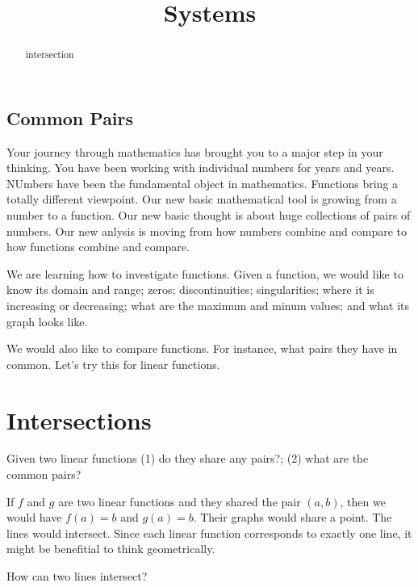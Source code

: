 \documentclass{ximera}
\title{Systems}
\begin{document}
\begin{abstract}
intersection
\end{abstract}
\maketitle



\subsection{Common Pairs}

Your journey through mathematics has brought you to a major step in your thinking. You have been working with individual numbers for years and years. NUmbers have been the fundamental object in mathematics. Functions bring a totally different viewpoint. Our new basic mathematical tool is growing from a number to a function.  Our new basic thought is about huge collections of pairs of numbers.  Our new anlysis is moving from how numbers combine and compare to how functions combine and compare.

We are learning how to investigate functions.  Given a function, we would like to know its domain and range; zeros; discontinuities; singularities; where it is increasing or decreasing; what are the maximum and minum values; and what its graph looks like.

We would also like to compare functions.  For instance, what pairs they have in common. Let's try this for linear functions.



\section{Intersections}

Given two linear functions (1) do they share any pairs?; (2) what are the common pairs?



If $f$ and $g$ are two linear functions and they shared the pair $(a, b)$, then we would have $f(a)=b$ and $g(a)=b$.  Their graphs would share a point. The lines would intersect. Since each linear function corresponds to exactly one line, it might be benefitial to think geometrically.  

How can two lines intersect?
\end{document}
